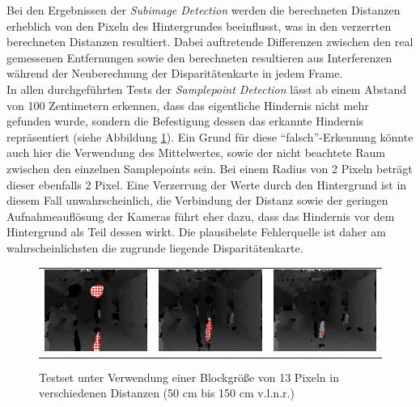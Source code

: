 \noindent
Bei den Ergebnissen der \emph{Subimage Detection} werden die berechneten Distanzen erheblich von den Pixeln des Hintergrundes beeinflusst, was in den verzerrten berechneten Distanzen resultiert. Dabei auftretende Differenzen zwischen den real gemessenen Entfernungen sowie den berechneten resultieren aus Interferenzen während der Neuberechnung der Disparitätenkarte in jedem Frame.\\

\noindent
In allen durchgeführten Tests der \emph{Samplepoint Detection} lässt ab einem Abstand von 100 Zentimetern erkennen, dass das eigentliche Hindernis nicht mehr gefunden wurde, sondern die Befestigung dessen das erkannte Hindernis repräsentiert (siehe Abbildung \ref{fig:distance_sample_images}). Ein Grund für diese \enquote{falsch}-Erkennung könnte auch hier die Verwendung des Mittelwertes, sowie der nicht beachtete Raum zwischen den einzelnen Samplepoints sein. Bei einem Radius von 2 Pixeln beträgt dieser ebenfalls 2 Pixel. Eine Verzerrung der Werte durch den Hintergrund ist in diesem Fall unwahrscheinlich, die Verbindung der Distanz sowie der geringen Aufnahmeauflösung der Kameras führt eher dazu, dass das Hindernis vor dem Hintergrund als Teil dessen wirkt. Die plausibelste Fehlerquelle ist daher am wahrscheinlichsten die zugrunde liegende Disparitätenkarte.

\begin{figure}[h]
	\centering
	\begin{tabular}{ccc}
	\includegraphics[width=4cm]{img/evaluation/distance_sample/_test_0_disparity}&
	\includegraphics[width=4cm]{img/evaluation/distance_sample/_test_1_disparity}&
	\includegraphics[width=4cm]{img/evaluation/distance_sample/_test_2_disparity}
	\end{tabular}
	\caption{Testset unter Verwendung einer Blockgröße von 13 Pixeln in verschiedenen Distanzen (50 cm bis 150 cm v.l.n.r.)}
	\label{fig:distance_sample_images}
\end{figure}


